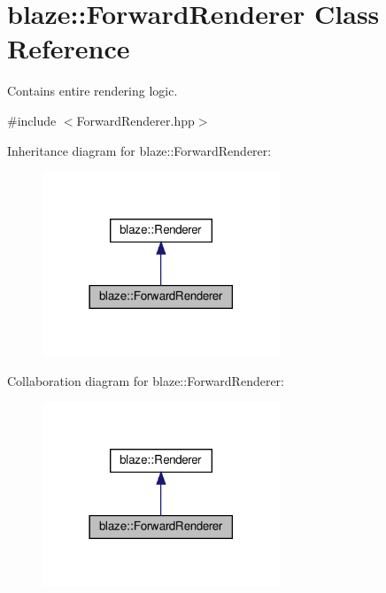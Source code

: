 \hypertarget{classblaze_1_1ForwardRenderer}{}\section{blaze\+:\+:Forward\+Renderer Class Reference}
\label{classblaze_1_1ForwardRenderer}


Contains entire rendering logic.  




{\ttfamily \#include $<$Forward\+Renderer.\+hpp$>$}



Inheritance diagram for blaze\+:\+:Forward\+Renderer\+:\nopagebreak
\begin{figure}[H]
\begin{center}
\leavevmode
\includegraphics[width=201pt]{classblaze_1_1ForwardRenderer__inherit__graph}
\end{center}
\end{figure}


Collaboration diagram for blaze\+:\+:Forward\+Renderer\+:\nopagebreak
\begin{figure}[H]
\begin{center}
\leavevmode
\includegraphics[width=201pt]{classblaze_1_1ForwardRenderer__coll__graph}
\end{center}
\end{figure}
